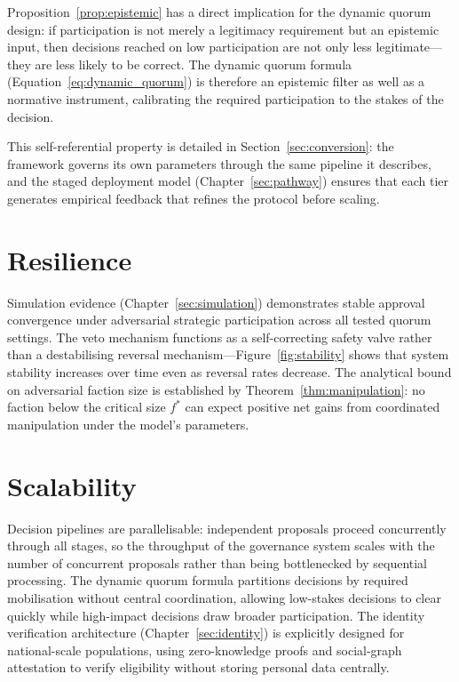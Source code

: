 \documentclass[12pt,a4paper,oneside]{report}
\begin{document}
Proposition~\ref{prop:epistemic} has a direct implication for the dynamic quorum design: if participation is not merely a legitimacy requirement but an epistemic input, then decisions reached on low participation are not only less legitimate---they are less likely to be correct. The dynamic quorum formula (Equation~\ref{eq:dynamic_quorum}) is therefore an epistemic filter as well as a normative instrument, calibrating the required participation to the stakes of the decision.

This self-referential property is detailed in Section~\ref{sec:conversion}: the framework governs its own parameters through the same pipeline it describes, and the staged deployment model (Chapter~\ref{sec:pathway}) ensures that each tier generates empirical feedback that refines the protocol before scaling.

\section{Resilience}

Simulation evidence (Chapter~\ref{sec:simulation}) demonstrates stable approval convergence under adversarial strategic participation across all tested quorum settings. The veto mechanism functions as a self-correcting safety valve rather than a destabilising reversal mechanism---Figure~\ref{fig:stability} shows that system stability increases over time even as reversal rates decrease. The analytical bound on adversarial faction size is established by Theorem~\ref{thm:manipulation}: no faction below the critical size $f^*$ can expect positive net gains from coordinated manipulation under the model's parameters.

\section{Scalability}

Decision pipelines are parallelisable: independent proposals proceed concurrently through all stages, so the throughput of the governance system scales with the number of concurrent proposals rather than being bottlenecked by sequential processing. The dynamic quorum formula partitions decisions by required mobilisation without central coordination, allowing low-stakes decisions to clear quickly while high-impact decisions draw broader participation. The identity verification architecture (Chapter~\ref{sec:identity}) is explicitly designed for national-scale populations, using zero-knowledge proofs and social-graph attestation to verify eligibility without storing personal data centrally.
\end{document}

